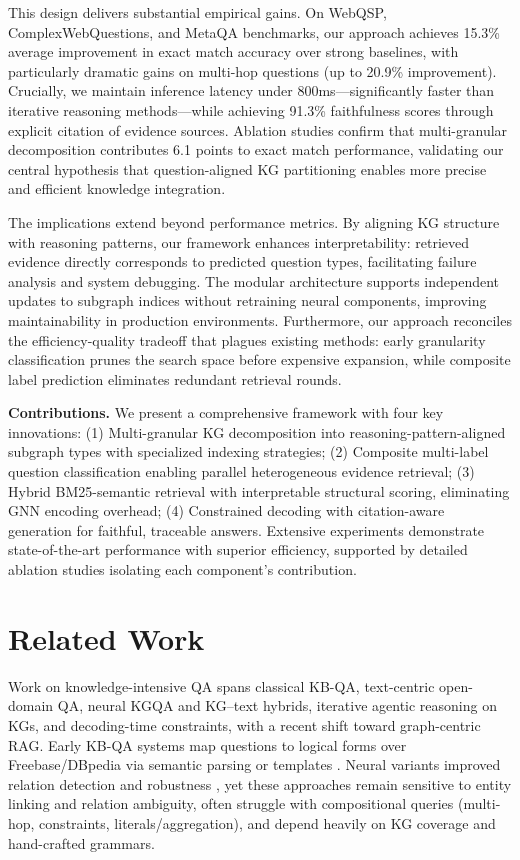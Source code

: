 \documentclass[conference]{IEEEtran}
\begin{document}
This design delivers substantial empirical gains. On WebQSP, ComplexWebQuestions, and MetaQA benchmarks, our approach achieves 15.3\% average improvement in exact match accuracy over strong baselines, with particularly dramatic gains on multi-hop questions (up to 20.9\% improvement). Crucially, we maintain inference latency under 800ms---significantly faster than iterative reasoning methods---while achieving 91.3\% faithfulness scores through explicit citation of evidence sources. Ablation studies confirm that multi-granular decomposition contributes 6.1 points to exact match performance, validating our central hypothesis that question-aligned KG partitioning enables more precise and efficient knowledge integration.

The implications extend beyond performance metrics. By aligning KG structure with reasoning patterns, our framework enhances interpretability: retrieved evidence directly corresponds to predicted question types, facilitating failure analysis and system debugging. The modular architecture supports independent updates to subgraph indices without retraining neural components, improving maintainability in production environments. Furthermore, our approach reconciles the efficiency-quality tradeoff that plagues existing methods: early granularity classification prunes the search space before expensive expansion, while composite label prediction eliminates redundant retrieval rounds.

\textbf{Contributions.} We present a comprehensive framework with four key innovations: (1) Multi-granular KG decomposition into reasoning-pattern-aligned subgraph types with specialized indexing strategies; (2) Composite multi-label question classification enabling parallel heterogeneous evidence retrieval; (3) Hybrid BM25-semantic retrieval with interpretable structural scoring, eliminating GNN encoding overhead; (4) Constrained decoding with citation-aware generation for faithful, traceable answers. Extensive experiments demonstrate state-of-the-art performance with superior efficiency, supported by detailed ablation studies isolating each component's contribution.

\section{Related Work}

Work on knowledge-intensive QA spans classical KB-QA, text-centric open-domain QA, neural KGQA and KG–text hybrids, iterative agentic reasoning on KGs, and decoding-time constraints, with a recent shift toward graph-centric RAG. Early KB-QA systems map questions to logical forms over Freebase/DBpedia via semantic parsing or templates \cite{berant2013semantic,yih2015stagg,bast2015aqqu,fader2014openkb}. Neural variants improved relation detection and robustness \cite{dong2015mccnn,bordes2015memnn,lukovnikov2017nnkgqa,yang2017neurallp}, yet these approaches remain sensitive to entity linking and relation ambiguity, often struggle with compositional queries (multi-hop, constraints, literals/aggregation), and depend heavily on KG coverage and hand-crafted grammars.
\end{document}
